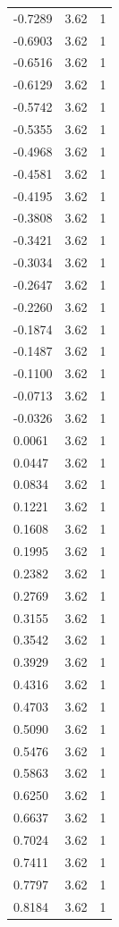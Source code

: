\begin{longtable}{lrr}
  -0.7289 & 3.62 & 1 \\
  -0.6903 & 3.62 & 1 \\
  -0.6516 & 3.62 & 1 \\
  -0.6129 & 3.62 & 1 \\
  -0.5742 & 3.62 & 1 \\
  -0.5355 & 3.62 & 1 \\
  -0.4968 & 3.62 & 1 \\
  -0.4581 & 3.62 & 1 \\
  -0.4195 & 3.62 & 1 \\
  -0.3808 & 3.62 & 1 \\
  -0.3421 & 3.62 & 1 \\
  -0.3034 & 3.62 & 1 \\
  -0.2647 & 3.62 & 1 \\
  -0.2260 & 3.62 & 1 \\
  -0.1874 & 3.62 & 1 \\
  -0.1487 & 3.62 & 1 \\
  -0.1100 & 3.62 & 1 \\
  -0.0713 & 3.62 & 1 \\
  -0.0326 & 3.62 & 1 \\
  0.0061 & 3.62 & 1 \\
  0.0447 & 3.62 & 1 \\
  0.0834 & 3.62 & 1 \\
  0.1221 & 3.62 & 1 \\
  0.1608 & 3.62 & 1 \\
  0.1995 & 3.62 & 1 \\
  0.2382 & 3.62 & 1 \\
  0.2769 & 3.62 & 1 \\
  0.3155 & 3.62 & 1 \\
  0.3542 & 3.62 & 1 \\
  0.3929 & 3.62 & 1 \\
  0.4316 & 3.62 & 1 \\
  0.4703 & 3.62 & 1 \\
  0.5090 & 3.62 & 1 \\
  0.5476 & 3.62 & 1 \\
  0.5863 & 3.62 & 1 \\
  0.6250 & 3.62 & 1 \\
  0.6637 & 3.62 & 1 \\
  0.7024 & 3.62 & 1 \\
  0.7411 & 3.62 & 1 \\
  0.7797 & 3.62 & 1 \\
  0.8184 & 3.62 & 1 \\

\end{longtable}
